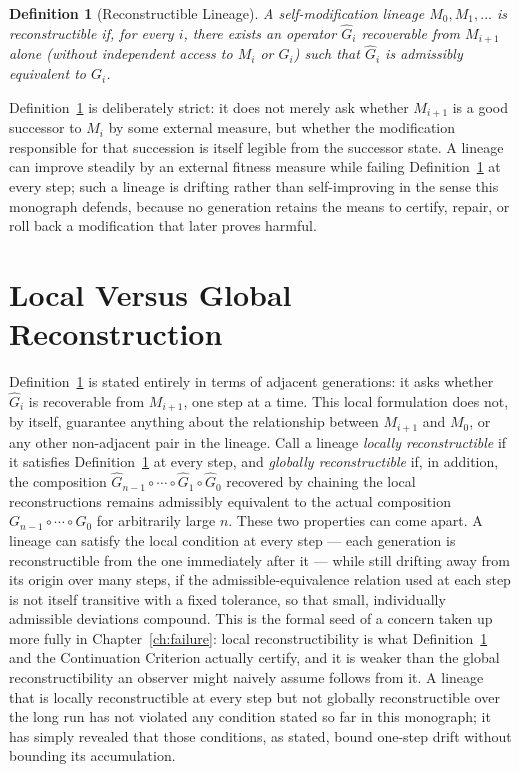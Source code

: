 \documentclass[11pt]{book}
\newtheorem{definition}{Definition}[chapter]
\begin{document}
\begin{definition}[Reconstructible Lineage]
\label{def:reconlineage}
A self-modification lineage $M_0, M_1, \dots$ is \emph{reconstructible} if, for every $i$, there exists an operator $\widehat{G}_i$ recoverable from $M_{i+1}$ alone (without independent access to $M_i$ or $G_i$) such that $\widehat{G}_i$ is admissibly equivalent to $G_i$.
\end{definition}

Definition~\ref{def:reconlineage} is deliberately strict: it does not merely ask whether $M_{i+1}$ is a good successor to $M_i$ by some external measure, but whether the modification responsible for that succession is itself legible from the successor state. A lineage can improve steadily by an external fitness measure while failing Definition~\ref{def:reconlineage} at every step; such a lineage is drifting rather than self-improving in the sense this monograph defends, because no generation retains the means to certify, repair, or roll back a modification that later proves harmful.

\section{Local Versus Global Reconstruction}

Definition~\ref{def:reconlineage} is stated entirely in terms of adjacent generations: it asks whether $\widehat{G}_i$ is recoverable from $M_{i+1}$, one step at a time. This local formulation does not, by itself, guarantee anything about the relationship between $M_{i+1}$ and $M_0$, or any other non-adjacent pair in the lineage. Call a lineage \emph{locally reconstructible} if it satisfies Definition~\ref{def:reconlineage} at every step, and \emph{globally reconstructible} if, in addition, the composition $\widehat{G}_{n-1}\circ\cdots\circ\widehat{G}_1\circ\widehat{G}_0$ recovered by chaining the local reconstructions remains admissibly equivalent to the actual composition $G_{n-1}\circ\cdots\circ G_0$ for arbitrarily large $n$. These two properties can come apart. A lineage can satisfy the local condition at every step --- each generation is reconstructible from the one immediately after it --- while still drifting away from its origin over many steps, if the admissible-equivalence relation used at each step is not itself transitive with a fixed tolerance, so that small, individually admissible deviations compound. This is the formal seed of a concern taken up more fully in Chapter~\ref{ch:failure}: local reconstructibility is what Definition~\ref{def:reconlineage} and the Continuation Criterion actually certify, and it is weaker than the global reconstructibility an observer might naively assume follows from it. A lineage that is locally reconstructible at every step but not globally reconstructible over the long run has not violated any condition stated so far in this monograph; it has simply revealed that those conditions, as stated, bound one-step drift without bounding its accumulation.
\end{document}
